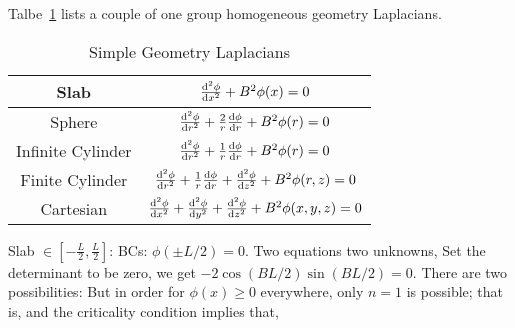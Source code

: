 \documentclass{school-22.211-notes}
\begin{document}
Talbe~\ref{simple-geometry-laplacian} lists a couple of one group homogeneous geometry Laplacians. 
\begin{table}
  \centering
  \begin{tabular}{|c|c|} \hline
    Slab & $\frac{\mathrm{d}^{2}\phi}{\mathrm{d}x^{2}} + B^2 \phi(x) = 0$ \\ \hline
    Sphere & $\frac{\mathrm{d}^{2}\phi}{\mathrm{d}r^{2}} + \frac{2}{r} \frac{\mathrm{d}\phi}{\mathrm{d}r} + B^2 \phi(r) = 0$ \\ \hline
    Infinite Cylinder & $\frac{\mathrm{d}^{2}\phi}{\mathrm{d}r^{2}} + \frac{1}{r} \frac{\mathrm{d}\phi}{\mathrm{d}r} + B^2 \phi(r) = 0$ \\ \hline
    Finite Cylinder & $\frac{\mathrm{d}^{2}\phi}{\mathrm{d}r^{2}} + \frac{1}{r} \frac{\mathrm{d}\phi}{\mathrm{d}r} + \frac{\mathrm{d}^{2}\phi}{\mathrm{d}z^{2}} + B^2 \phi(r,z) = 0$ \\ \hline
    Cartesian & $\frac{\mathrm{d}^{2}\phi}{\mathrm{d}x^{2}} + \frac{\mathrm{d}^{2}\phi}{\mathrm{d}y^{2}} + \frac{\mathrm{d}^{2}\phi}{\mathrm{d}z^{2}} + B^2 \phi(x,y,z) = 0$ \\ \hline
  \end{tabular}
\caption{Simple Geometry Laplacians} \label{simple-geometry-laplacian}
\end{table}




\clearpage
{}
 Slab $\in  \left[- \frac{L}{2}, \frac{L}{2} \right]$:
BCs: $\phi(\pm L/2) = 0$. Two equations two unknowns, 
  Set the determinant to be zero, we get $-2 \cos (BL/2) \sin (BL/2) = 0$. There are two possibilities: 
But in order for $\phi(x) \ge 0$ everywhere, only $n=1$ is possible; that is, 
and the criticality condition implies that, 
\end{document}

